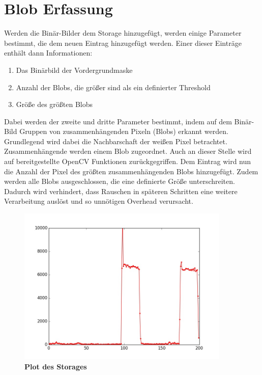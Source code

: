 \section{Blob Erfassung}
\label{sec:blob}
%

Werden die Binär-Bilder dem Storage hinzugefügt, werden einige Parameter bestimmt, die dem neuen Eintrag hinzugefügt werden.
Einer dieser Einträge enthält dann Informationen:
\begin{enumerate}
	\item Das Binärbild der Vordergrundmaske
	\item Anzahl der Blobs, die größer sind als ein definierter Threshold
	\item Größe des größten Blobs
\end{enumerate}
Dabei werden der zweite und dritte Parameter bestimmt, indem auf dem Binär-Bild Gruppen von zusammenhängenden Pixeln (Blobs) erkannt werden. 
Grundlegend wird dabei die Nachbarschaft der weißen Pixel betrachtet. Zusammenhängende werden einem Blob zugeordnet. Auch an dieser Stelle wird auf bereitgestellte OpenCV Funktionen zurückgegriffen. Dem Eintrag wird nun die Anzahl der Pixel des größten zusammenhängenden Blobs hinzugefügt. Zudem werden alle Blobs ausgeschlossen, die eine definierte Größe unterschreiten. Dadurch wird verhindert, dass Rauschen in späteren Schritten eine weitere Verarbeitung auslöst und so unnötigen Overhead verursacht.
\begin{figure}[ht]
\centering
\includegraphics[width=0.9\textwidth]{media/plot.jpg}
\caption{\textbf{Plot des Storages}}
\label{Fig:blobplot}
\end{figure}

